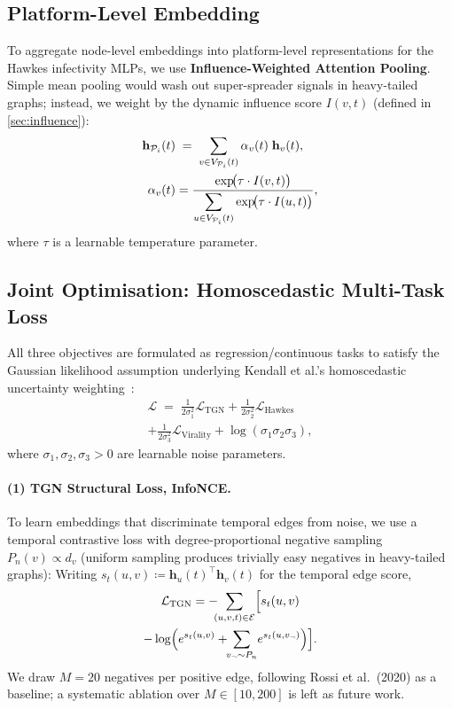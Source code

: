 \documentclass[11pt]{article}
\newcommand{\hv}{\mathbf{h}}
\newcommand{\cE}{\mathcal{E}}
\newcommand{\cP}{\mathcal{P}}
\begin{document}
\subsection{Platform-Level Embedding}
\label{sec:platform-emb}

To aggregate node-level embeddings into platform-level representations for the
Hawkes infectivity MLPs, we use \textbf{Influence-Weighted Attention Pooling}.
Simple mean pooling would wash out super-spreader signals in heavy-tailed graphs;
instead, we weight by the dynamic influence score $I(v,t)$
(defined in \cref{sec:influence}):
\begin{align}
  \hv_{\cP_i}(t) &\;=\;
  \sum_{v\in V_{\cP_i}(t)}
  \alpha_v(t)\;\hv_v(t),
  \notag \\
  \alpha_v(t) &= \frac{
    \exp\!\bigl(\tau\cdot I(v,t)\bigr)
  }{
    \displaystyle\sum_{u\in V_{\cP_i}(t)}
    \exp\!\bigl(\tau\cdot I(u,t)\bigr)
  },
  \label{eq:platform-emb}
\end{align}
where $\tau$ is a learnable temperature parameter.

\subsection{Joint Optimisation: Homoscedastic Multi-Task Loss}
\label{sec:loss}

All three objectives are formulated as regression/continuous tasks to satisfy
the Gaussian likelihood assumption underlying Kendall et al.'s homoscedastic
uncertainty weighting~\citep{kendall2018multi}:
\begin{multline}
  \mathcal{L}
  \;=\;
  \frac{1}{2\sigma_1^2}\mathcal{L}_{\mathrm{TGN}}
  + \frac{1}{2\sigma_2^2}\mathcal{L}_{\mathrm{Hawkes}} \\
  + \frac{1}{2\sigma_3^2}\mathcal{L}_{\mathrm{Virality}}
  + \log(\sigma_1\sigma_2\sigma_3),
  \label{eq:joint-loss}
\end{multline}
where $\sigma_1,\sigma_2,\sigma_3 > 0$ are learnable noise parameters.

\paragraph{(1) TGN Structural Loss, InfoNCE.}
To learn embeddings that discriminate temporal edges from noise, we use a
temporal contrastive loss with degree-proportional negative sampling
$P_n(v)\propto d_v$ (uniform sampling produces trivially easy negatives in
heavy-tailed graphs):
Writing $s_t(u,v) \coloneqq \hv_u(t)^\top \hv_v(t)$ for the temporal edge
score,
\begin{multline}
  \mathcal{L}_{\mathrm{TGN}}
  = -\!\!\!\sum_{(u,v,t)\in\cE}
  \Bigl[ s_t(u,v) \\
  - \log\Bigl(
    e^{s_t(u,v)}
    +\!\!\sum_{v_{\neg}\sim P_n}\! e^{s_t(u,v_{\neg})}
  \Bigr) \Bigr].
  \label{eq:info-nce}
\end{multline}
We draw $M=20$ negatives per positive edge, following Rossi et al.~(2020) as a
baseline; a systematic ablation over $M\in[10,200]$ is left as future work.
\end{document}
